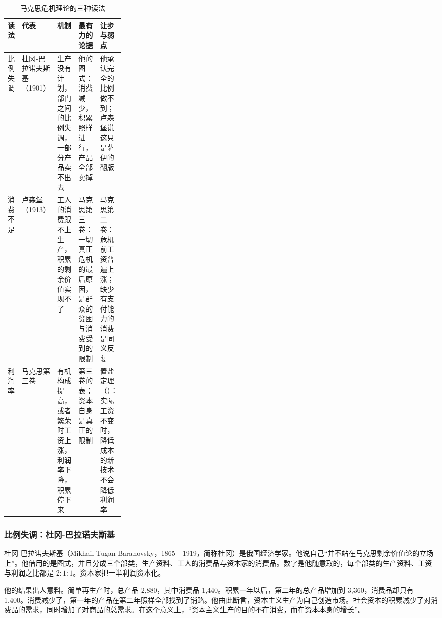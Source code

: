 \begin{table}[!tb]\centering\small
\caption{马克思危机理论的三种读法}\label{tab:marx-readings}
\begin{tabularx}{\linewidth}{@{}>{\raggedright\arraybackslash}p{0.12\linewidth}>{\raggedright\arraybackslash}p{0.15\linewidth}YYY@{}}
\toprule
读法 & 代表 & 机制 & 最有力的论据 & 让步与弱点 \\\midrule
比例失调 & 杜冈-巴拉诺夫斯基（1901） & 生产没有计划，部门之间的比例失调，一部分产品卖不出去 & 他的图式：消费减少，积累照样进行，产品全部卖掉 & 他承认完全的比例做不到；卢森堡说这只是萨伊的翻版 \\
消费不足 & 卢森堡（1913） & 工人的消费跟不上生产，积累的剩余价值实现不了 & 马克思第三卷：一切真正危机的最后原因，是群众的贫困与消费受到的限制 & 马克思第二卷：危机前工资普遍上涨；缺少有支付能力的消费是同义反复 \\
利润率 & 马克思第三卷 & 有机构成提高，或者繁荣时工资上涨，利润率下降，积累停下来 & 第三卷的表；资本自身是真正的限制 & 置盐定理（）：实际工资不变时，降低成本的新技术不会降低利润率 \\
\bottomrule
\end{tabularx}
\end{table}

\subsubsection{比例失调：杜冈-巴拉诺夫斯基}
杜冈-巴拉诺夫斯基（Mikhail Tugan-Baranovsky，1865—1919，简称杜冈）是俄国经济学家。他说自己“并不站在马克思剩余价值论的立场上”\cite{tugan1901}。他借用的是图式，并且分成三个部类，生产资料、工人的消费品与资本家的消费品。数字是他随意取的，每个部类的生产资料、工资与利润之比都是 $2:1:1$\cite{tugan1901}。资本家把一半利润资本化\cite{tugan1901}。

他的结果出人意料。简单再生产时，总产品 2,880，其中消费品 1,440。积累一年以后，第二年的总产品增加到 3,360，消费品却只有 1,400\cite{tugan1901}。消费减少了，第一年的产品在第二年照样全部找到了销路\cite{tugan1901}。他由此断言，资本主义生产为自己创造市场\cite{tugan1901}。社会资本的积累减少了对消费品的需求，同时增加了对商品的总需求\cite{tugan1901}。在这个意义上，“资本主义生产的目的不在消费，而在资本本身的增长”\cite{tugan1901}。

